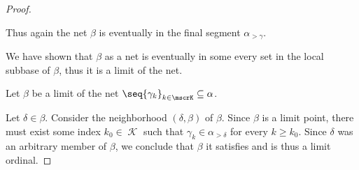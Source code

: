 \begin{proof}
\begin{itemize}
    Thus again the net \( \beta \) is eventually in the final segment \( \alpha_{>\gamma} \).
  \end{itemize}

   We have shown that \( \beta \) as a net is eventually in some every set in the local subbase of \( \beta \), thus it is a limit of the net.

   \NecessitySubProof Let \( \beta \) be a limit of the net \( \seq{ \gamma_k }_{k \in \mscrK} \subseteq \alpha \).

   Let \( \delta \in \beta \). Consider the neighborhood \( (\delta, \beta) \) of \( \beta \). Since \( \beta \) is a limit point, there must exist some index \( k_0 \in \mscrK \) such that \( \gamma_k \in \alpha_{>\delta} \) for every \( k \geq k_0 \). Since \( \delta \) was an arbitrary member of \( \beta \), we conclude that \( \beta \) it satisfies  and is thus a limit ordinal.
\end{proof}
